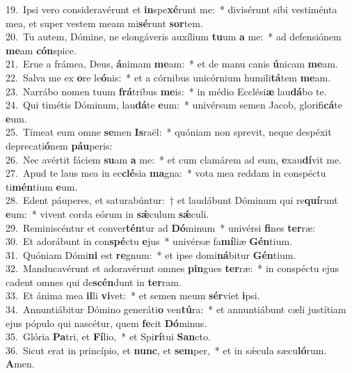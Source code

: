 {19.~}Ipsi vero consideravérunt et \textbf{in}spe\textbf{xé}runt me:~* divisérunt sibi vestiménta mea, et super vestem meam mi\textbf{sé}runt \textbf{sor}tem.\\
{20.~}Tu autem, Dómine, ne elongáveris auxílium \textbf{tu}um \textbf{a} me:~* ad defensiónem \textbf{me}am \textbf{cón}spice.\\
{21.~}Erue a frámea, Deus, \textbf{á}nimam \textbf{me}am:~* et de manu canis \textbf{ú}nicam \textbf{me}am.\\
{22.~}Salva me ex \textbf{o}re le\textbf{ó}nis:~* et a córnibus unicórnium humili\textbf{tá}tem \textbf{me}am.\\
{23.~}Narrábo nomen tuum \textbf{frá}tribus \textbf{me}is:~* in médio Ecclési\textbf{æ} lau\textbf{dá}bo te.\\
{24.~}Qui timétis Dóminum, lau\textbf{dá}te \textbf{e}um:~* univérsum semen Jacob, glorifi\textbf{cá}te \textbf{e}um.\\
{25.~}Tímeat eum omne \textbf{se}men \textbf{Is}raël:~* quóniam non sprevit, neque despéxit deprecati\textbf{ó}nem \textbf{páu}peris:\\
{26.~}Nec avértit fáciem \textbf{su}am \textbf{a} me:~* et cum clamárem ad eum, \textbf{e}xau\textbf{dí}vit me.\\
{27.~}Apud te laus mea in ec\textbf{clé}sia \textbf{ma}gna:~* vota mea reddam in conspéctu ti\textbf{mén}tium \textbf{e}um.\\
{28.~}Edent páuperes, et saturabúntur:~† et laudábunt Dóminum qui re\textbf{quí}runt \textbf{e}um:~* vivent corda eórum in \textbf{sǽ}culum \textbf{sǽ}culi.\\
{29.~}Reminiscéntur et conver\textbf{tén}tur ad \textbf{Dó}minum~* univérsi \textbf{fi}nes \textbf{ter}ræ:\\
{30.~}Et adorábunt in con\textbf{spé}ctu \textbf{e}jus~* univérsæ fa\textbf{mí}liæ \textbf{Gén}tium.\\
{31.~}Quóniam Dómi\textbf{ni} est \textbf{re}gnum:~* et ipse domi\textbf{ná}bitur \textbf{Gén}tium.\\
{32.~}Manducavérunt et adoravérunt omnes \textbf{pin}gues \textbf{ter}ræ:~* in conspéctu ejus cadent omnes qui de\textbf{scén}dunt in \textbf{ter}ram.\\
{33.~}Et ánima mea \textbf{il}li \textbf{vi}vet:~* et semen meum \textbf{sér}viet \textbf{i}psi.\\
{34.~}Annuntiábitur Dómino generáti\textbf{o} ven\textbf{tú}ra:~* et annuntiábunt cæli justítiam ejus pópulo qui nascétur, quem \textbf{fe}cit \textbf{Dó}minus.\\
{35.~}Glória \textbf{Pa}tri, et \textbf{Fí}lio,~* et Spi\textbf{rí}tui \textbf{San}cto.\\
{36.~}Sicut erat in princípio, et \textbf{nunc}, et \textbf{sem}per,~* et in sǽcula sæcu\textbf{ló}rum. \textbf{A}men.\\
